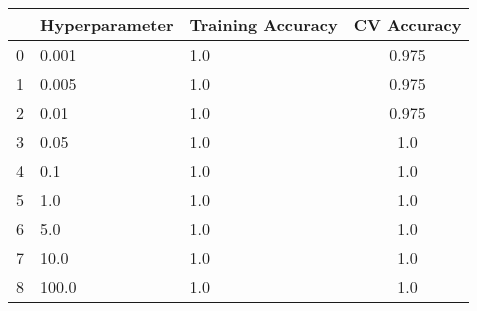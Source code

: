 \def\arraystretch{1.25}
\begin{center}
{\small
\begin{tabular}{l l l c}
\hline
\hline
&\textbf{Hyperparameter}&\textbf{Training Accuracy} & \textbf{CV Accuracy}\\
\hline
\hline
0&0.001&1.0&0.975\\
\hline
1&0.005&1.0&0.975\\
\hline
2&0.01&1.0&0.975\\
\hline
3&0.05&1.0&1.0\\
\hline
4&0.1&1.0&1.0\\
\hline
5&1.0&1.0&1.0\\
\hline
6&5.0&1.0&1.0\\
\hline
7&10.0&1.0&1.0\\
\hline
8&100.0&1.0&1.0\\
\hline
\end{tabular}

}
\end{center}